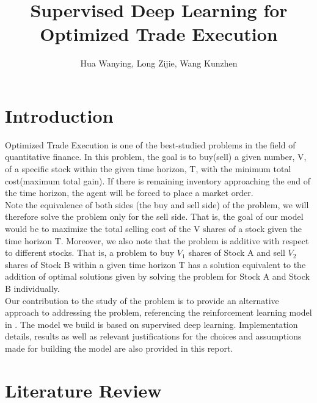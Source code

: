 \documentclass[12pt]{extarticle}
\title{Supervised Deep Learning for Optimized Trade Execution}
\author{Hua Wanying, Long Zijie, Wang Kunzhen}
\begin{document}
\maketitle

\section{Introduction}
Optimized Trade Execution is one of the best-studied problems in the field
of quantitative finance. In this problem, the goal is to buy(sell) a given
number, V, of a specific stock within the given time horizon, T, with the
minimum total cost(maximum total gain). If there is remaining inventory
approaching the end of the time horizon, the agent will be forced to place
a market order. \\


\noindent Note the equivalence of both sides (the buy and sell side) of the
problem, we will therefore solve the problem only for the sell side. That is,
the goal of our model would be to maximize the total selling cost of the
V shares of a stock given the time horizon T. Moreover, we also note that
the problem is additive with respect to different stocks. That is, a problem
to buy $V_1$ shares of Stock A and sell $V_2$ shares of Stock B within a given
time horizon T has a solution equivalent to the addition of optimal solutions given by
solving the problem for Stock A and Stock B individually.\\


\noindent Our contribution to the study of the problem is to provide an alternative
approach to addressing the problem, referencing the reinforcement learning model in
\cite{reinforcement}. The model we build is based on supervised deep learning.
Implementation details, results as well as relevant justifications for the choices
and assumptions made for building the model are also provided in this report.

\section{Literature Review}
\end{document}
